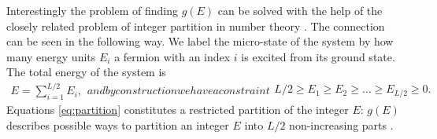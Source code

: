 \documentclass[aps,showpacs,twocolumn,floatfix,prx,superscriptaddress]{revtex4-1}
\begin{document}
Interestingly the problem of finding $g(E)$ can be solved with the help of the closely related problem of integer partition in number theory \cite{andrews1998theory}. The connection can be seen in the following way. We label the micro-state of the system by how many energy units $E_i$ a fermion with an index $i$ is excited from its ground state. The total energy of the system is
\begin{subequations} \label{eq:partition}
\begin{align}
E= \sum_{i=1}^{L/2} E_i,
\end{align}
and by construction we have a constraint 
\begin{align}
L/2 \ge E_1 \ge E_2 \ge \ldots \ge E_{L/2} \ge 0. \label{eq:partition_constraint}
\end{align}
\end{subequations}
Equations \eqref{eq:partition} constitutes a restricted partition of the integer $E$: $g(E)$ describes possible ways to partition an integer $E$ into $L/2$ non-increasing parts \cite{andrews1998theory}.
\end{document}
